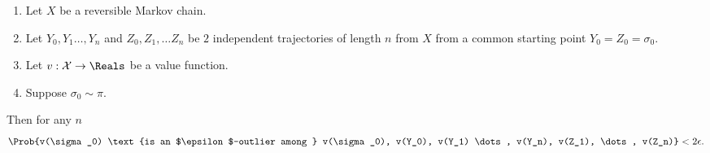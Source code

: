 \documentclass[12pt]{article}
\begin{document}
\begin{theorem}
    \label{thm:parallelsignificance:twoepstest}
    \begin{enumerate}
        \item
            Let \( X \) be a reversible Markov chain.
        \item
            Let \( Y_0, Y_1 \dots, Y_n \) and \( Z_0, Z_1, \dots Z_n \)
            be \( 2 \) independent trajectories of length \( n \) from \(
            X \) from a common starting point \( Y_0 = Z_0 = \sigma_0 \).
        \item
            Let \( v :  \mathcal{X} \to \Reals \) be a value function.
        \item
            Suppose \( \sigma_0 \sim \pi \).
    \end{enumerate}
    Then for any \( n \)
    \[
        \Prob{v(\sigma_0) \text{is an $\epsilon$-outlier among } v(\sigma_0),
        v(Y_0), v(Y_1) \dots, v(Y_n), v(Z_1), \dots, v(Z_n)} < 2
        \epsilon.
      \]
      
\end{theorem}
\end{document}
